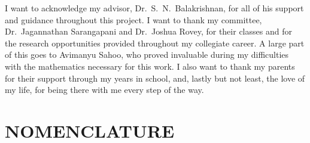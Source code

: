 I want to acknowledge my advisor, Dr.\ S.\ N.\ Balakrishnan, for all of his
support and guidance throughout this project. I want to thank my committee,
Dr.\ Jagannathan Sarangapani and Dr.\ Joshua Rovey, for their classes and for
the research opportunities provided throughout my collegiate career. A large
part of this goes to Avimanyu Sahoo, who proved invaluable during my
difficulties with the mathematics necessary for this work. I also want to thank
my parents for their support through my years in school, and, lastly but not
least, the love of my life, for being there with me every step of the way.

\clearpage

\singlespacing
\tableofcontents
\clearpage
\listoffigures
{}
\clearpage
\listoftables
{}
\clearpage

\chapter*{NOMENCLATURE}

